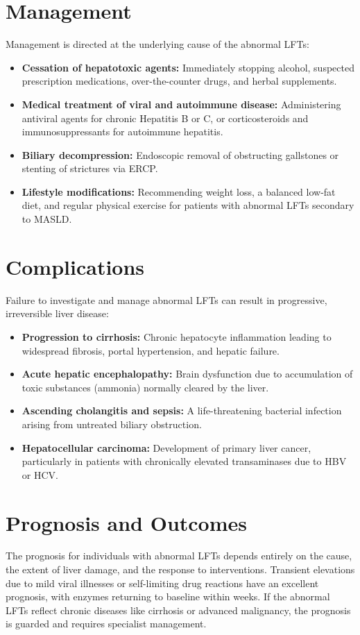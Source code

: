 \section*{Management}
Management is directed at the underlying cause of the abnormal LFTs:

\begin{itemize}
    \item \textbf{Cessation of hepatotoxic agents:} Immediately stopping alcohol, suspected prescription medications, over-the-counter drugs, and herbal supplements.
    \item \textbf{Medical treatment of viral and autoimmune disease:} Administering antiviral agents for chronic Hepatitis B or C, or corticosteroids and immunosuppressants for autoimmune hepatitis.
    \item \textbf{Biliary decompression:} Endoscopic removal of obstructing gallstones or stenting of strictures via ERCP.
    \item \textbf{Lifestyle modifications:} Recommending weight loss, a balanced low-fat diet, and regular physical exercise for patients with abnormal LFTs secondary to MASLD.
\end{itemize}

\section*{Complications}
Failure to investigate and manage abnormal LFTs can result in progressive, irreversible liver disease:

\begin{itemize}
    \item \textbf{Progression to cirrhosis:} Chronic hepatocyte inflammation leading to widespread fibrosis, portal hypertension, and hepatic failure.
    \item \textbf{Acute hepatic encephalopathy:} Brain dysfunction due to accumulation of toxic substances (ammonia) normally cleared by the liver.
    \item \textbf{Ascending cholangitis and sepsis:} A life-threatening bacterial infection arising from untreated biliary obstruction.
    \item \textbf{Hepatocellular carcinoma:} Development of primary liver cancer, particularly in patients with chronically elevated transaminases due to HBV or HCV.
\end{itemize}

\section*{Prognosis and Outcomes}
The prognosis for individuals with abnormal LFTs depends entirely on the cause, the extent of liver damage, and the response to interventions. Transient elevations due to mild viral illnesses or self-limiting drug reactions have an excellent prognosis, with enzymes returning to baseline within weeks. If the abnormal LFTs reflect chronic diseases like cirrhosis or advanced malignancy, the prognosis is guarded and requires specialist management.

